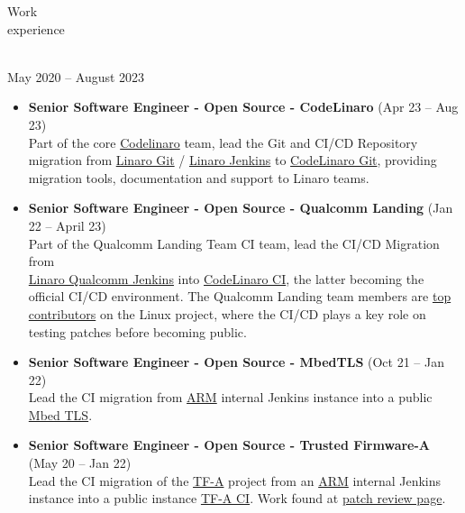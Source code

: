 \documentclass{resume}
\def\linaro{Linaro Limited}
\begin{document}
\begin{category}{Work \\experience}

  \citem{\linaro}\\
  May 2020 -- August 2023

  \begin{itemize}
  \item \textbf{Senior Software Engineer - Open Source - CodeLinaro} (Apr 23 -- Aug 23)\\
    Part of the core \href{www.codelinaro.org}{Codelinaro} team, lead the Git and CI/CD Repository migration
    from \href{https://git.linaro.org}{Linaro Git} / \href{https://ci.linaro.org}{Linaro Jenkins} to
    \href{https://git.codelinaro.org}{CodeLinaro Git}, providing migration tools, documentation and support to Linaro teams.
  \end{itemize}

  \begin{itemize}
  \item \textbf{Senior Software Engineer - Open Source - Qualcomm Landing} (Jan 22 -- April 23)\\
    Part of the Qualcomm Landing Team CI team, lead the CI/CD Migration from \\
    \href{https://ci.linaro.org/view/qclt/}{Linaro Qualcomm Jenkins} into
    \href{https://git.codelinaro.org/linaro/qcomlt/ci/configs}{CodeLinaro CI}, the latter becoming the official CI/CD environment.
    The Qualcomm Landing team members are \href{https://kernelnewbies.org/DevelopmentStatistics}{top contributors} on the Linux project,
    where the CI/CD plays a key role on testing patches before becoming public.
  \end{itemize}

  \begin{itemize}
  \item \textbf{Senior Software Engineer - Open Source - MbedTLS} (Oct 21 -- Jan 22)\\
    Lead the CI migration from \href{https://www.arm.com/}{ARM} internal Jenkins instance into a public \href{https://github.com/ARMmbed/mbedtls}{Mbed TLS}.
  \end{itemize}

  \begin{itemize}
  \item \textbf{Senior Software Engineer - Open Source - Trusted Firmware-A} (May 20 -- Jan 22)\\
    Lead the CI migration of the \href{https://www.trustedfirmware.org/projects/tf-a/}{TF-A}
    project from an \href{https://www.arm.com/}{ARM} internal Jenkins instance into a public instance \href{https://ci.trustedfirmware.org/}{TF-A CI}.
    Work found at \href{https://review.trustedfirmware.org/q/owner:leonardo.sandoval%2540linaro.org}{patch review page}.
  \end{itemize}


\end{category}
\end{document}
